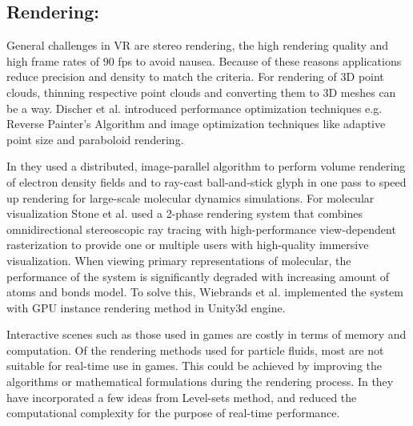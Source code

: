 \documentclass[10pt,twocolumn,letterpaper]{article}
\begin{document}
\subsection{Rendering:}
General challenges in VR are stereo rendering, the high rendering quality and high frame rates of 90 fps to avoid nausea. Because of these reasons applications reduce precision and density to match the criteria. For rendering of 3D point clouds, thinning respective point clouds \cite{peters2016robust} and converting them to 3D meshes \cite{berger2017survey} can be a way. Discher et al. \cite{discher_point-based_2018} introduced performance optimization techniques e.g. Reverse Painter’s Algorithm and image optimization techniques like adaptive point size and paraboloid rendering. 

 In \cite{reda_visualizing_2013} they used a distributed, image-parallel algorithm to perform volume rendering of electron density fields and to ray-cast ball-and-stick glyph in one pass to speed up rendering for large-scale molecular dynamics simulations. For molecular visualization Stone et al. \cite{stone_immersive_2016} used a 2-phase rendering system that combines omnidirectional stereoscopic ray tracing with high-performance view-dependent rasterization to provide one or multiple users with high-quality immersive visualization. When viewing primary representations of molecular, the performance of the system is significantly degraded with increasing amount of atoms and bonds model. To solve this, Wiebrands et al. \cite{Wiebrands2018} implemented the system with GPU instance rendering method in Unity3d engine. 

Interactive scenes such as those used in games are costly in terms of memory and computation. Of the rendering methods used for particle fluids, most are not suitable for real-time use in games. This could be achieved by improving the algorithms or mathematical formulations during the rendering process. In \cite{VanderLaan2009} they have incorporated a few ideas from Level-sets method, and reduced the computational complexity for the purpose of real-time performance.



\end{document}

